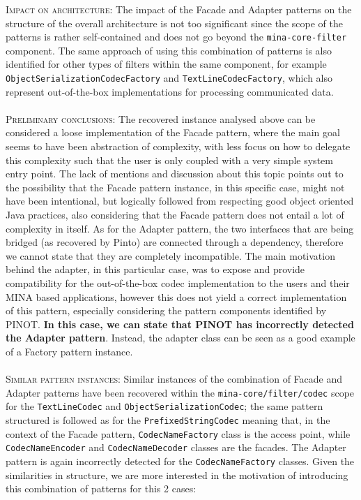 \textsc{Impact on architecture}: The impact of the Facade and Adapter patterns on the structure of the overall architecture is not too significant since the scope of the patterns is rather self-contained and does not go beyond the \texttt{mina-core-filter} component. The same approach of using this combination of patterns is also identified for other types of filters within the same component, for example \texttt{ObjectSerializationCodecFactory} and \texttt{TextLineCodecFactory}, which also represent out-of-the-box implementations for processing communicated data.\\\\
\textsc{Preliminary conclusions}: The recovered instance analysed above can be considered a loose implementation of the Facade pattern, where the main goal seems to have been abstraction of complexity, with less focus on how to delegate this complexity such that the user is only coupled with a very simple system entry point. The lack of mentions and discussion about this topic points out to the possibility that the Facade pattern instance, in this specific case, might not have been intentional, but logically followed from respecting good object oriented Java practices, also considering that the Facade pattern does not entail a lot of complexity in itself. As for the Adapter pattern, the two interfaces that are being bridged (as recovered by Pinto) are connected through a dependency, therefore we cannot state that they are completely incompatible. The main motivation behind the adapter, in this particular case, was to expose and provide compatibility for the out-of-the-box codec implementation to the users and their MINA based applications, however this does not yield a correct implementation of this pattern, especially considering the pattern components identified by PINOT. \textbf{In this case, we can state that PINOT has incorrectly detected the Adapter pattern}. Instead, the adapter class can be seen as a good example of a Factory pattern instance.\\\\
\textsc{Similar pattern instances}:  Similar instances of the combination of Facade and Adapter patterns have been recovered within the \texttt{mina-core/filter/codec} scope for the \texttt{TextLineCodec} and \texttt{ObjectSerializationCodec}; the same pattern structured is followed as for the \texttt{PrefixedStringCodec} meaning that, in the context of the Facade pattern, \texttt{CodecNameFactory} class is the access point, while \texttt{CodecNameEncoder} and \texttt{CodecNameDecoder} classes are the facades. The Adapter pattern is again incorrectly detected for the \texttt{CodecNameFactory} classes. Given the similarities in structure, we are more interested in the motivation of introducing this combination of patterns for this 2 cases:
